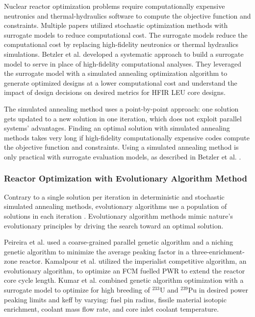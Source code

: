 Nuclear reactor optimization problems require computationally 
expensive neutronics and thermal-hydraulics software to compute the objective 
function and constraints. 
Multiple papers utilized stochastic optimization methods with surrogate models 
to reduce computational cost. 
The surrogate models reduce the computational cost by replacing high-fidelity
neutronics or thermal hydraulics simulations.
Betzler et al. \cite{betzler_design_2019} developed a systematic approach to 
build a surrogate model to serve in place of high-fidelity computational 
analyses. 
They leveraged the surrogate model with a simulated annealing optimization 
algorithm to generate optimized designs at a lower computational cost and
understand the impact of design decisions on desired metrics for \gls{HFIR} \gls{LEU} 
core designs.

The simulated annealing method uses a point-by-point approach:
one solution gets updated to a new solution in one iteration, which does not 
exploit parallel systems' advantages.
Finding an optimal solution with simulated annealing methods takes very long if 
high-fidelity computationally expensive codes compute the objective function and 
constraints.
Using a simulated annealing method is only practical with surrogate evaluation models, 
as described in Betzler et al. \cite{betzler_design_2019}.

\subsubsection{Reactor Optimization with Evolutionary Algorithm Method}
Contrary to a single solution per iteration in deterministic and stochastic 
simulated annealing methods, evolutionary algorithms use a population of 
solutions in each iteration \cite{deb_multi-objective_2001}. 
Evolutionary algorithm methods mimic nature's evolutionary principles by driving 
the search toward an optimal solution.

Peireira et al. \cite{pereira_coarse-grained_2003,pereira_parallel_2008} 
used a coarse-grained parallel genetic algorithm and a niching genetic algorithm
to minimize the average peaking factor in a three-enrichment-zone reactor. 
Kamalpour et al. \cite{kamalpour_smart_2020} utilized the imperialist competitive 
algorithm, an evolutionary algorithm, to optimize an \gls{FCM} fuelled 
\gls{PWR} to extend the reactor core cycle length. 
Kumar et al. \cite{kumar_new_2015} combined genetic algorithm optimization 
with a surrogate model to optimize for high breeding of $^{233}$U and $^{239}$Pu 
in desired power peaking limits and keff by varying: fuel pin 
radius,  fissile material isotopic enrichment, coolant mass flow rate, and 
core inlet coolant temperature.

